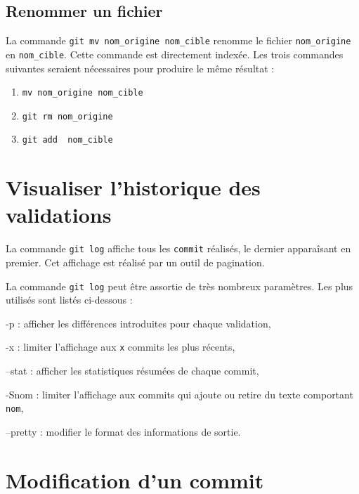 \documentclass[11pt,twoside,headings=normal,open=right,french,DIV=12]{scrreprt}
\newcommand{\spec}[1]{\texttt{#1}}
\begin{document}
\subsection{Renommer un fichier}



    La commande \verb|git mv nom_origine nom_cible| renomme le fichier \spec{nom\_origine} en \spec{nom\_cible}.
    Cette commande est directement indexée. Les trois commandes suivantes seraient nécessaires pour produire le même résultat :
    \begin{enumerate}
        \item \verb|mv nom_origine nom_cible|
  		\item \verb|git rm nom_origine|
		\item \verb|git add  nom_cible|
    \end{enumerate}



\section{Visualiser l'historique des validations}


  
La commande \verb|git log| affiche tous les \spec{commit} réalisés, le dernier apparaîsant en premier. Cet affichage est réalisé par un outil de pagination.
    
    \smallskip
    
    La commande \verb|git log| peut être assortie de très nombreux paramètres. Les plus utilisés sont listés ci-dessous :
    \begin{description}
            \item {-p} : afficher les différences introduites pour chaque validation,
        \item {-x} : limiter l'affichage aux \spec{x} commits les plus récents,
        \item {--stat} : afficher les statistiques résumées de chaque commit,
        \item {-Snom} : limiter l'affichage aux commits qui ajoute ou retire du texte comportant \spec{nom},
        \item {--pretty} : modifier le format des informations de sortie.
    \end{description}



\section{Modification d'un commit}
\end{document}
